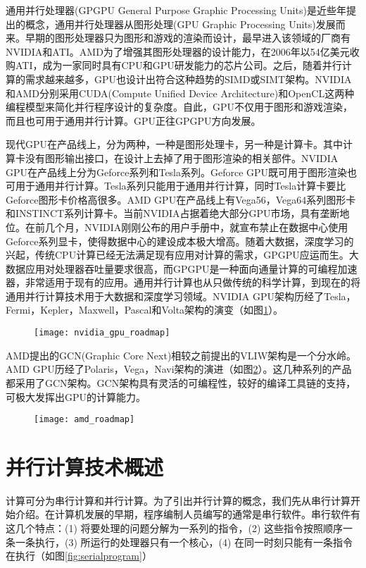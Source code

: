 通用并行处理器(GPGPU General Purpose Graphic Processing Units)是近些年提出的概念，通用并行处理器从图形处理(GPU Graphic Processing Units)发展而来。早期的图形处理器只为图形和游戏的渲染而设计，最早进入该领域的厂商有NVIDIA和ATI。AMD为了增强其图形处理器的设计能力，在2006年以54亿美元收购ATI，成为一家同时具有CPU和GPU研发能力的芯片公司。之后，随着并行计算的需求越来越多，GPU也设计出符合这种趋势的SIMD或SIMT架构。NVIDIA和AMD分别采用CUDA(Compute Unified Device Architecture)和OpenCL这两种编程模型来简化并行程序设计的复杂度。自此，GPU不仅用于图形和游戏渲染，而且也可用于通用并行计算。GPU正往GPGPU方向发展。

现代GPU在产品线上，分为两种，一种是图形处理卡，另一种是计算卡。其中计算卡没有图形输出接口，在设计上去掉了用于图形渲染的相关部件。NVIDIA GPU在产品线上分为Geforce系列和Tesla系列。Geforce GPU既可用于图形渲染也可用于通用并行计算。Tesla系列只能用于通用并行计算，同时Tesla计算卡要比Geforce图形卡价格高很多。AMD GPU在产品线上有Vega56，Vega64系列图形卡和INSTINCT系列计算卡。当前NVIDIA占据着绝大部分GPU市场，具有垄断地位。在前几个月，NVIDIA刚刚公布的用户手册中，就宣布禁止在数据中心使用Geforce系列显卡，使得数据中心的建设成本极大增高。随着大数据，深度学习的兴起，传统CPU计算已经无法满足现有应用对计算的需求，GPGPU应运而生。大数据应用对处理器吞吐量要求很高，而GPGPU是一种面向通量计算的可编程加速器，非常适用于现有的应用。通用并行计算也从只做传统的科学计算，到现在的将通用并行计算技术用于大数据和深度学习领域。NVIDIA GPU架构历经了Tesla，Fermi，Kepler，Maxwell，Pascal和Volta架构的演变（如图\ref{fig:nvidia_gpu_roadmap}）。

\begin{figure}[!htbp]
	\centering
	\texttt{[image: nvidia\_gpu\_roadmap]}
	\label{fig:nvidia_gpu_roadmap}
\end{figure}

AMD提出的GCN(Graphic Core Next)相较之前提出的VLIW架构是一个分水岭。AMD GPU历经了Polaris，Vega，Navi架构的演进（如图\ref{fig:amd_roadmap}）。这几种系列的产品都采用了GCN架构。GCN架构具有灵活的可编程性，较好的编译工具链的支持，可极大发挥出GPU的计算能力。
\begin{figure}[!htbp]
	\centering
	\texttt{[image: amd\_roadmap]}
	\label{fig:amd_roadmap}
\end{figure}

\section{并行计算技术概述}
计算可分为串行计算和并行计算。为了引出并行计算的概念，我们先从串行计算开始介绍。在计算机发展的早期，程序编制人员编写的通常是串行软件。串行软件有这几个特点：(1) 将要处理的问题分解为一系列的指令，(2) 这些指令按照顺序一条一条执行，(3) 所运行的处理器只有一个核心，(4) 在同一时刻只能有一条指令在执行（如图\ref{fig:serialprogram}）

